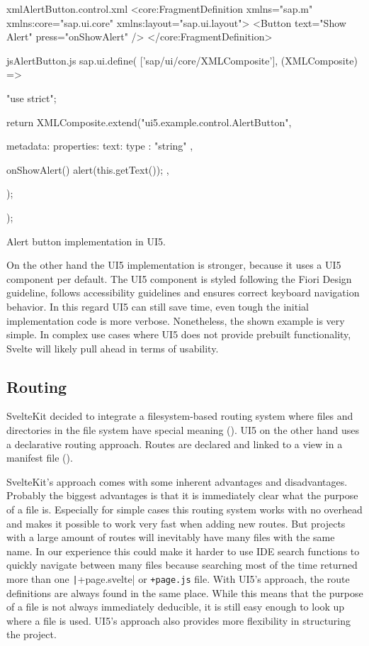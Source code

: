 \begin{listing}[H]
\begin{myminted}{xml}{AlertButton.control.xml}
<core:FragmentDefinition 
    xmlns="sap.m" 
    xmlns:core="sap.ui.core" 
    xmlns:layout="sap.ui.layout">
  <Button text="Show Alert" press="onShowAlert" />
</core:FragmentDefinition>
\end{myminted}
\begin{myminted}{js}{AlertButton.js}
sap.ui.define(
  ['sap/ui/core/XMLComposite'], 
  (XMLComposite) => {
  "use strict";

  return XMLComposite.extend("ui5.example.control.AlertButton", {
    metadata: {
      properties: { text: {type : "string" } }
    },

    onShowAlert() {
      alert(this.getText());
    },
  });
});
\end{myminted}
\caption{Alert button implementation in UI5.}
\label{fig:evaluation-component-ui5}
\end{listing}

On the other hand the UI5 implementation is stronger, because it uses a UI5 component per default. The UI5 component is styled following the Fiori Design guideline, follows accessibility guidelines and ensures correct keyboard navigation behavior. In this regard UI5 can still save time, even tough the initial implementation code is more verbose. Nonetheless, the shown example is very simple. In complex use cases where UI5 does not provide prebuilt functionality, Svelte will likely pull ahead in terms of usability.
 

\subsection{Routing}
SvelteKit decided to integrate a filesystem-based routing system where files and directories in the file system have special meaning (). UI5 on the other hand uses a declarative routing approach. Routes are declared and linked to a view in a manifest file (). 

SvelteKit's approach comes with some inherent advantages and disadvantages. Probably the biggest advantages is that it is immediately clear what the purpose of a file is. Especially for simple cases this routing system works with no overhead and makes it possible to work very fast when adding new routes. But projects with a large amount of routes will inevitably have many files with the same name. In our experience this could make it harder to use IDE search functions to quickly navigate between many files because searching most of the time returned more than one \texttt|+page.svelte| or \texttt{+page.js} file. With UI5's approach, the route definitions are always found in the same place. While this means that the purpose of a file is not always immediately deducible, it is still easy enough to look up where a file is used. UI5's approach also provides more flexibility in structuring the project.


